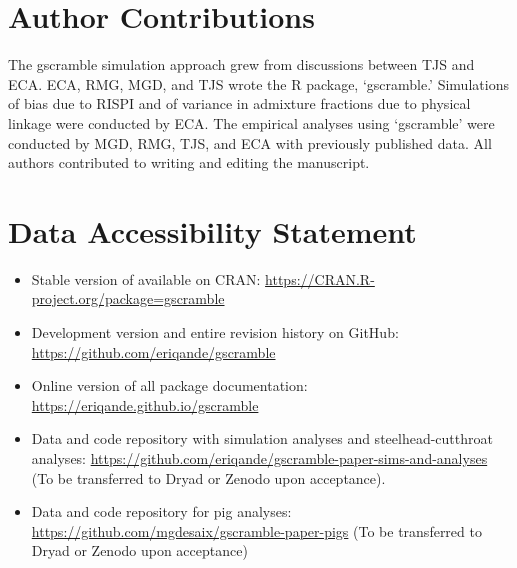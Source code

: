 \section*{Author Contributions}

The gscramble simulation approach grew from discussions between TJS and ECA\@.
ECA, RMG, MGD, and TJS wrote the R package, `gscramble.'   Simulations of bias due to RISPI and
of variance in admixture fractions due to physical linkage were conducted by ECA.
The empirical analyses using `gscramble' were conducted by MGD, RMG, TJS, and ECA with previously published data.
All authors contributed to writing and editing the manuscript.

\section*{Data Accessibility Statement}

\begin{itemize}
\item Stable version of \gscramble{} available on CRAN: \url{https://CRAN.R-project.org/package=gscramble}
\item Development version and entire revision history on GitHub: \url{https://github.com/eriqande/gscramble}
\item Online version of all package documentation: \url{https://eriqande.github.io/gscramble}
\item Data and code repository with simulation analyses and steelhead-cutthroat analyses: \url{https://github.com/eriqande/gscramble-paper-sims-and-analyses} (To be transferred to Dryad or Zenodo upon acceptance).
\item Data and code repository for pig analyses: \url{https://github.com/mgdesaix/gscramble-paper-pigs} (To be transferred to Dryad or Zenodo upon acceptance)
\end{itemize}
\mbox{}

